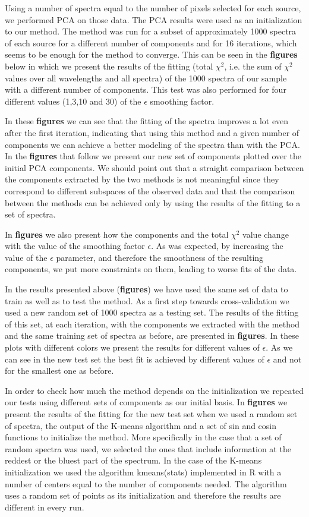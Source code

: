 \documentclass[12pt]{article}
\begin{document}
Using a number of spectra equal to the number of pixels selected for each source, we performed PCA on those data. The PCA results were used as an initialization to our method. The method was run for a subset of approximately 1000 spectra of each source for a different number of components and for 16 iterations, which seems to be enough for the method to converge. This can be seen in the \textbf{figures} below in which we present the results of the fitting (total $\chi^2$, i.e. the sum of $\chi^2$ values over all wavelengths and all spectra) of the 1000 spectra of our sample with a different number of components. This test was also performed for four different values (1,3,10 and 30) of the $\epsilon$ smoothing factor.

In these \textbf{figures} we can see that the fitting of the spectra improves a lot even after the first iteration, indicating that using this method and a given number of components we can achieve a better modeling of the spectra than with the PCA. In the \textbf{figures} that follow we present our new set of components plotted over the initial PCA components. We should point out that a straight comparison between the components extracted by the two methods is not meaningful since they correspond to different subspaces of the observed data and that the comparison between the methods can be achieved only by using the results of the fitting to a set of spectra.

In \textbf{figures} we also present how the components and the total $\chi^2$ value change with the value of the smoothing factor $\epsilon$. As was expected, by increasing the value of the $\epsilon$ parameter, and therefore the smoothness of the resulting components, we put more constraints on them, leading to worse fits of the data.

In the results presented above (\textbf{figures}) we have used the same set of data to train as well as to test the method. As a first step towards cross-validation we used a new random set of 1000 spectra as a testing set. The results of the fitting of this set, at each iteration, with the components we extracted with the method and the same training set of spectra as before, are presented in \textbf{figures}. In these plots with different colors we present the results for different values of $\epsilon$. As we can see in the new test set the best fit is achieved by different values of $\epsilon$ and not for the smallest one as before.

In order to check how much the method depends on the initialization we repeated our tests using different sets of components as our initial basis. In \textbf{figures} we present the results of the fitting for the new test set when we used a random set of spectra, the output of the K-means algorithm and a set of sin and cosin functions to initialize the method. More specifically in the case that a set of random spectra was used, we selected the ones that include information at the reddest or the bluest part of the spectrum. In the case of the K-means initialization we used the algorithm kmeans(stats) implemented in R with a number of centers equal to the number of components needed. The algorithm uses a random set of points as its initialization and therefore the results are different in every run.
\end{document}
